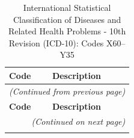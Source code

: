 
\begin{longtable}{p{2.2cm} p{10.3cm}}

\caption{International Statistical Classification of Diseases and Related Health Problems - 10th Revision (ICD-10): Codes X60--Y35}
\label{tab:icd10_x60_y35} \\

\toprule
\textbf{Code} & \textbf{Description} \\
\midrule
\endfirsthead

\multicolumn{2}{l}{\small\itshape (Continued from previous page)} \\[2pt]
\toprule
\textbf{Code} & \textbf{Description} \\
\midrule
\endhead

\midrule
\multicolumn{2}{r}{\small\itshape (Continued on next page)} \\
\endfoot

\bottomrule
\endlastfoot


\end{longtable}
